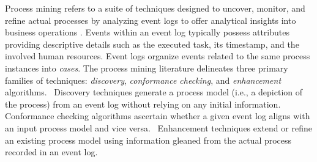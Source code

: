 \begin{newj}



Process mining refers to a suite of techniques designed to uncover, monitor, and refine actual processes by analyzing event logs to offer analytical insights into business operations \cite{van2012process}. Events within an event log typically possess attributes providing descriptive details such as the executed task, its timestamp, and the involved human resources. Event logs organize events related to the same process instances into \emph{cases}. The process mining literature delineates three primary families of techniques: \emph{discovery}, \emph{conformance checking}, and \emph{enhancement} algorithms.~\cite{DBLP:journals/tmis/Aalst12} Discovery techniques generate a process model (i.e., a depiction of the process) from an event log without relying on any initial information.~\cite{weijters2006process} Conformance checking algorithms ascertain whether a given event log aligns with an input process model and vice versa.~\cite{vanderAalst2016} Enhancement techniques extend or refine an existing process model using information gleaned from the actual process recorded in an event log.~\cite{DBLP:journals/tmis/Aalst12, DBLP:conf/simpda/YasminBS18}


\end{newj}
